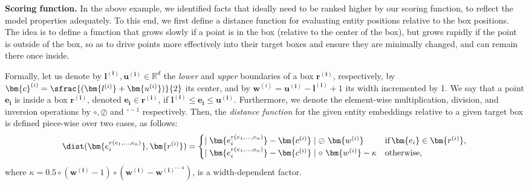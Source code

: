 \documentclass{article}
\begin{document}
\textbf{Scoring function.} 
In the above example, we identified facts that ideally need to be ranked higher by our scoring function,  to reflect the model properties adequately.
To this end, we first define a distance function for evaluating entity positions relative to the box positions.
The idea is to define a function that grows slowly if a point is in the box (relative to the center of the box), but grows rapidly if the point is outside of the box, so as to drive points more effectively into their target boxes and ensure they are minimally changed, and can remain there once inside. 


Formally, let us denote by $\bm{l^{(i)}}, \bm{u^{(i)}} \in \mathbb{R}^d$ the \emph{lower} and \emph{upper} boundaries of a box $\bm{r^{(i)}}$, respectively, by ${\bm{c}^{(i)} = \sfrac{(\bm{l^{(i)}} + \bm{u^{(i)}})}{2}}$ its center, and by ${\bm{w}^{(i)} = \bm{u^{(i)}} - \bm{l^{(i)}} + 1}$ its width incremented by 1. We say that a point $\bm{e_i}$ is inside a box $\bm{r^{(i)}}$, denoted $\bm{e_i} \in \bm{r^{(i)}}$, if $\bm{l^{(i)}} \leq \bm{e_i} \leq \bm{u^{(i)}}$. Furthermore, we denote the element-wise multiplication, division, and  inversion operations by $\circ, \oslash$ and $^{\circ-1}$ respectively. Then, the \emph{distance function} for the given entity embeddings relative to a given target box is defined piece-wise over two cases, as follows:
\[
\dist(\bm{e_i^{r(e_1, ..., e_n)}}, \bm{r^{(i)}}) = 
\begin{cases} 
\mid \bm{e_i^{r(e_1, ..., e_n)}} - \bm{c^{(i)}}\mid \oslash~\bm{w^{(i)}} & \text{if} \, \bm{e_i} \in \bm{r^{(i)}}, \\ 
\mid\bm{e_i^{r(e_1, ..., e_n)}} - \bm{c^{(i)}}\mid \circ~\bm{w^{(i)}} -  \kappa & \text{otherwise,}
\end{cases}
\]where $\kappa = 0.5\circ(\bm{w^{(i)}}-1)\circ(\bm{w^{(i)}}-\bm{w^{(i)^{\circ-1}}})$, is a width-dependent factor.
\end{document}
